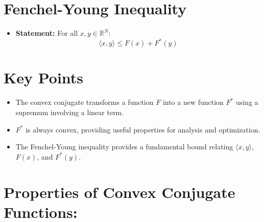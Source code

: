 \documentclass{article}
\begin{document}
\section*{Fenchel-Young Inequality}

\begin{itemize}
    \item \textbf{Statement:} For all \( x, y \in \mathbb{R}^N \):
    \[
    \langle x, y \rangle \leq F(x) + F^*(y)
    \]
\end{itemize}

\section*{Key Points}

\begin{itemize}
    \item The convex conjugate transforms a function \( F \) into a new function \( F^* \) using a supremum involving a linear term.
    \item \( F^* \) is always convex, providing useful properties for analysis and optimization.
    \item The Fenchel-Young inequality provides a fundamental bound relating \( \langle x, y \rangle \), \( F(x) \), and \( F^*(y) \).
\end{itemize}


\section*{Properties of Convex Conjugate Functions:}
\end{document}
